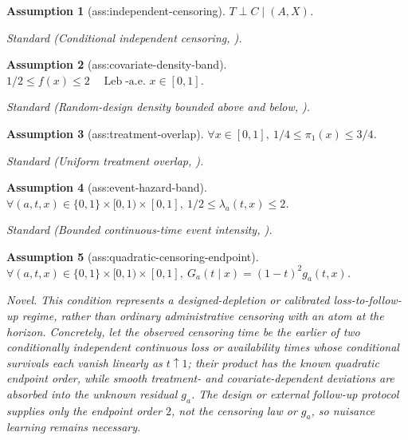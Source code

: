 \documentclass{article}
\newtheorem{assumption}{Assumption}
\begin{document}
\begin{assumption}[ass:independent-censoring]\label{ass:independent-censoring}
\(T\perp C\mid(A,X)\).
\par\smallskip\noindent\emph{Standard} (Conditional independent censoring, \cite{westling2024inference}).
\end{assumption}

\begin{assumption}[ass:covariate-density-band]\label{ass:covariate-density-band}
\(1/2\le f(x)\le2\quad\operatorname{Leb}\text{-a.e. }x\in[0,1]\).
\par\smallskip\noindent\emph{Standard} (Random-design density bounded above and below, \cite{cattaneo2024boundary}).
\end{assumption}

\begin{assumption}[ass:treatment-overlap]\label{ass:treatment-overlap}
\(\forall x\in[0,1],\ 1/4\le\pi_1(x)\le3/4\).
\par\smallskip\noindent\emph{Standard} (Uniform treatment overlap, \cite{westling2024inference}).
\end{assumption}

\begin{assumption}[ass:event-hazard-band]\label{ass:event-hazard-band}
\(\forall(a,t,x)\in\{0,1\}\times[0,1)\times[0,1],\ 1/2\le\lambda_a(t,x)\le2\).
\par\smallskip\noindent\emph{Standard} (Bounded continuous-time event intensity, \cite{jiangdoksum2003local}).
\end{assumption}

\begin{assumption}[ass:quadratic-censoring-endpoint]\label{ass:quadratic-censoring-endpoint}
\(\forall(a,t,x)\in\{0,1\}\times[0,1)\times[0,1],\ G_a(t\mid x)=(1-t)^2g_a(t,x)\).
\par\smallskip\noindent\emph{Novel.} This condition represents a designed-depletion or calibrated loss-to-follow-up regime, rather than ordinary administrative censoring with an atom at the horizon. Concretely, let the observed censoring time be the earlier of two conditionally independent continuous loss or availability times whose conditional survivals each vanish linearly as \(t\uparrow1\); their product has the known quadratic endpoint order, while smooth treatment- and covariate-dependent deviations are absorbed into the unknown residual \(g_a\). The design or external follow-up protocol supplies only the endpoint order \(2\), not the censoring law or \(g_a\), so nuisance learning remains necessary.
\end{assumption}
\end{document}
